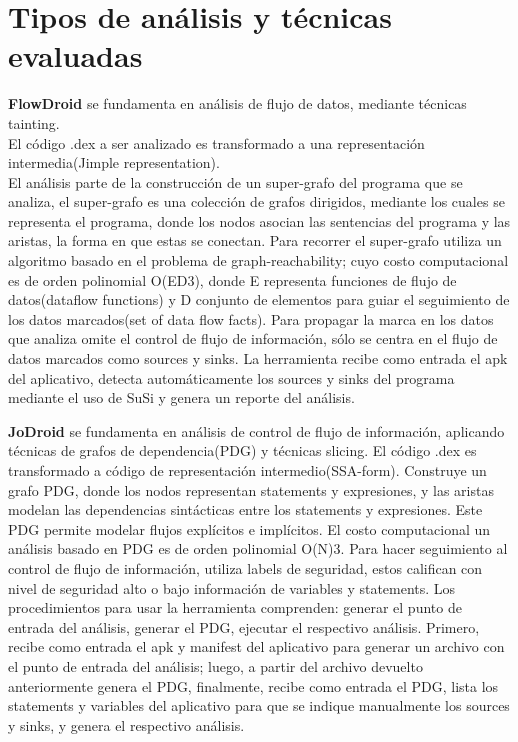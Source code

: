 \section{Tipos de análisis y técnicas evaluadas}
\textbf{FlowDroid} se fundamenta en análisis de flujo de datos, mediante
técnicas tainting.\\
El código .dex a ser analizado es transformado a una representación
intermedia(Jimple representation).\\
El análisis parte de la construcción de un super-grafo del programa que se
analiza, el super-grafo es una colección de grafos dirigidos, mediante los
cuales se representa el programa, donde los nodos asocian las sentencias del
programa y las aristas, la forma en que estas se conectan. Para recorrer el
super-grafo utiliza un algoritmo basado en el problema de
graph-reachability\cite{Graph-reachability}; cuyo costo computacional es de
orden polinomial O(ED3), donde E representa funciones de flujo de datos(dataflow
functions) y D conjunto de elementos para guiar el seguimiento de los
datos marcados(set of data flow facts).\newline
Para propagar la marca en los datos que analiza omite el control de flujo de
información, sólo se centra en el flujo de datos marcados como sources y
sinks.\newline
La herramienta recibe como entrada el apk del aplicativo, detecta
automáticamente los sources y sinks del programa mediante el uso de SuSi y
genera un reporte del análisis.

\textbf{JoDroid} se fundamenta en análisis de control de flujo de información,
aplicando técnicas de grafos de dependencia(PDG) y técnicas slicing.\newline 
El código .dex es transformado a código de representación intermedio(SSA-form).
Construye un grafo PDG, donde los nodos representan statements y expresiones, y
las aristas modelan las dependencias sintácticas entre los statements y
expresiones. Este PDG permite modelar flujos explícitos e implícitos.\newline
El costo computacional un análisis basado en PDG es de orden polinomial
O(N)3\cite[page 3]{FCO-PDG}.\newline 
Para hacer seguimiento al control de flujo de información, utiliza labels de
seguridad, estos califican con nivel de seguridad alto o bajo información de
variables y statements.\newline
Los procedimientos para usar la herramienta comprenden: generar el punto de
entrada del análisis, generar el PDG, ejecutar el respectivo análisis. Primero,
recibe como entrada el apk y manifest del aplicativo para generar un archivo con
el punto de entrada del análisis; luego, a partir del archivo devuelto
anteriormente genera el PDG, finalmente, recibe como entrada el PDG, lista los
statements y variables del aplicativo para que se indique manualmente los
sources y sinks, y genera el respectivo análisis.

